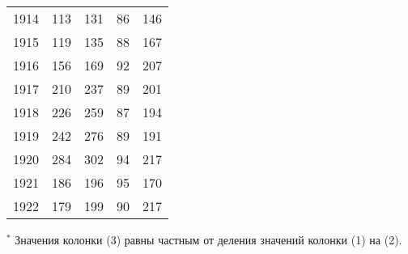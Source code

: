 \documentclass[leqno]{article}  %
\begin{document}
\begin{table}
{\begin{tabular}{p{}|p{}|p{}|p{}|p{}}
1914 & \hfill 113 \hspace*{6mm} & \hfill 131 \hspace*{6mm} & \hfill 86 \hspace*{6mm} & \hfill 146 \hspace*{6mm} \\
1915 & \hfill 119 \hspace*{6mm} & \hfill 135 \hspace*{6mm} & \hfill 88 \hspace*{6mm} & \hfill 167 \hspace*{6mm} \\
1916 & \hfill 156 \hspace*{6mm} & \hfill 169 \hspace*{6mm} & \hfill 92 \hspace*{6mm} & \hfill 207 \hspace*{6mm} \\
1917 & \hfill 210 \hspace*{6mm} & \hfill 237 \hspace*{6mm} & \hfill 89 \hspace*{6mm} & \hfill 201 \hspace*{6mm} \\
1918 & \hfill 226 \hspace*{6mm} & \hfill 259 \hspace*{6mm} & \hfill 87 \hspace*{6mm} & \hfill 194 \hspace*{6mm} \\
1919 & \hfill 242 \hspace*{6mm} & \hfill 276 \hspace*{6mm} & \hfill 89 \hspace*{6mm} & \hfill 191 \hspace*{6mm} \\
1920 & \hfill 284 \hspace*{6mm} & \hfill 302 \hspace*{6mm} & \hfill 94 \hspace*{6mm} & \hfill 217 \hspace*{6mm} \\
1921 & \hfill 186 \hspace*{6mm} & \hfill 196 \hspace*{6mm} & \hfill 95 \hspace*{6mm} & \hfill 170 \hspace*{6mm} \\
1922 & \hfill 179 \hspace*{6mm} & \hfill 199 \hspace*{6mm} & \hfill 90 \hspace*{6mm} & \hfill 217 \hspace*{6mm} \\
\hline
\end{tabular}
}
\par
\footnotesize{{}$^{\ast}$ Значения колонки (3) равны частным от деления значений колонки (1) на (2).}
\end{table}
\end{document}
